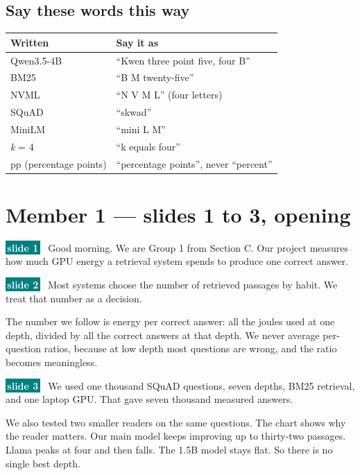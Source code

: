 \documentclass[11pt,a4paper]{article}
\newcommand{\slideref}[1]{%
  \colorbox{teal}{\textcolor{white}{\footnotesize\bfseries\,#1\,}}\ }
\begin{document}
\subsection*{Say these words this way}

\begin{center}
\small
\renewcommand{\arraystretch}{1.18}
\begin{tabularx}{\linewidth}{@{}lX@{}}
\toprule
\rowcolor{forest!16} \textbf{Written} & \textbf{Say it as} \\
\midrule
Qwen3.5-4B & ``Kwen three point five, four B'' \\
BM25 & ``B M twenty-five'' \\
NVML & ``N V M L'' (four letters) \\
SQuAD & ``skwad'' \\
MiniLM & ``mini L M'' \\
\textit{k} = 4 & ``k equals four'' \\
pp (percentage points) & ``percentage points'', never ``percent'' \\
\bottomrule
\end{tabularx}
\end{center}

\newpage

\section{Member 1 \textnormal{\small --- slides 1 to 3, opening}}

\begin{scriptbox}
\slideref{slide 1} Good morning. We are Group 1 from Section C. Our project measures how much GPU energy a retrieval system spends to produce one correct answer.

\slideref{slide 2} Most systems choose the number of retrieved passages by habit. We treat that number as a decision.

The number we follow is energy per correct answer: all the joules used at one depth, divided by all the correct answers at that depth. We never average per-question ratios, because at low depth most questions are wrong, and the ratio becomes meaningless.

\slideref{slide 3} We used one thousand SQuAD questions, seven depths, BM25 retrieval, and one laptop GPU. That gave seven thousand measured answers.

We also tested two smaller readers on the same questions. The chart shows why the reader matters. Our main model keeps improving up to thirty-two passages. Llama peaks at four and then falls. The 1.5B model stays flat. So there is no single best depth.
\end{scriptbox}
\end{document}

